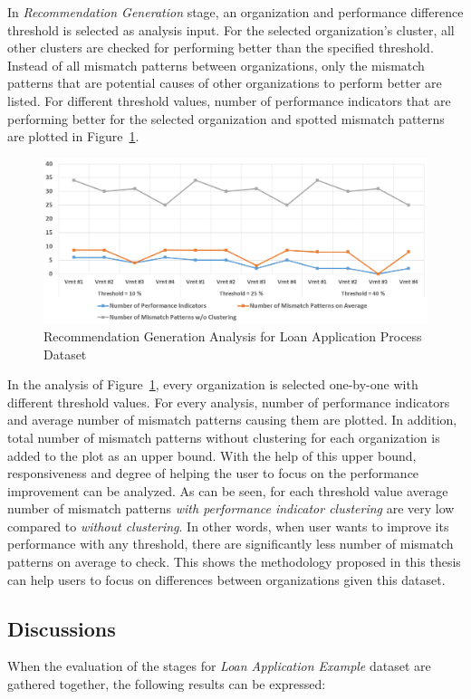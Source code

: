 In \textit{Recommendation Generation} stage, an organization and performance difference threshold is selected as analysis input. For the selected organization's cluster, all other clusters are checked for performing better than the specified threshold. Instead of all mismatch patterns between organizations, only the mismatch patterns that are potential causes of other organizations to perform better are listed. For different threshold values, number of performance indicators that are performing better for the selected organization and spotted mismatch patterns are plotted in Figure~\ref{fig:loan-recommendation-generation-analysis}. 
\begin{figure}
	\centering
	\includegraphics[width=\textwidth]{5_results_discussions/loan-application-process/recommendation-generation-analysis}
	\caption{Recommendation Generation Analysis for Loan Application Process Dataset}
  \label{fig:loan-recommendation-generation-analysis}
\end{figure}

In the analysis of Figure~\ref{fig:loan-recommendation-generation-analysis}, every organization is selected one-by-one with different threshold values. For every analysis, number of performance indicators and average number of mismatch patterns causing them are plotted. In addition, total number of mismatch patterns without clustering for each organization is added to the plot as an upper bound. With the help of this upper bound, responsiveness and degree of helping the user to focus on the performance improvement can be analyzed. As can be seen, for each threshold value average number of mismatch patterns \textit{with performance indicator clustering} are very low compared to \textit{without clustering}. In other words, when user wants to improve its performance with any threshold, there are significantly less number of mismatch patterns on average to check. This shows the methodology proposed in this thesis can help users to focus on differences between organizations given this dataset. 

\subsection{Discussions}
\label{sec:loan-app-discussions}
When the evaluation of the stages for \textit{Loan Application Example} dataset are gathered together, the following results can be expressed:

